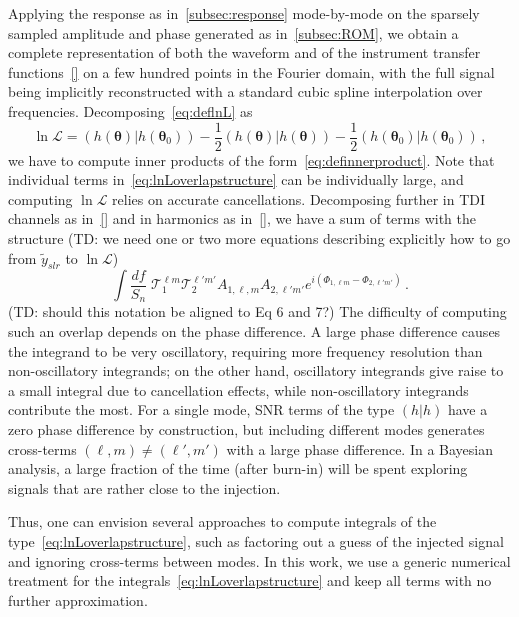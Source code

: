 \documentclass[aps,showpacs,twocolumn,prd,superscriptaddress,nofootinbib]{revtex4-1}
\newcommand{\be}{\begin{equation}}
\newcommand{\ee}{\end{equation}}
\newcommand\calT{{\mathcal{T}}}
\newcommand\calL{{\mathcal{L}}}
\newcommand{\tdc}[1]{{\color{red} (TD: #1)}}
\begin{document}
Applying the response as in~\ref{subsec:response} mode-by-mode on the sparsely sampled amplitude and phase generated as in~\ref{subsec:ROM}, we obtain a complete representation of both the waveform and of the instrument transfer functions~\eqref{} on a few hundred points in the Fourier domain, with the full signal being implicitly reconstructed with a standard cubic spline interpolation over frequencies. Decomposing~\eqref{eq:deflnL} as
\be\label{eq:lnLoverlapstructure}
	\ln \calL = \left( h(\bm{\theta}) | h(\bm{\theta}_{0}) \right)- \frac{1}{2} \left( h(\bm{\theta}) | h(\bm{\theta}) \right) - \frac{1}{2} \left( h(\bm{\theta}_{0}) | h(\bm{\theta}_{0}) \right) \,,
\ee
we have to compute inner products of the form~\eqref{eq:definnerproduct}. Note that individual terms in~\eqref{eq:lnLoverlapstructure} can be individually large, and computing $\ln \calL$ relies on accurate cancellations. Decomposing further in TDI channels as in~\eqref{} and in harmonics as in~\eqref{}, we have a sum of terms with the structure \tdc{we need one or two more equations describing explicitly how to go from $\tilde{y}_{slr}$ to $\ln \calL$}
\be
	\int \frac{df}{S_{n}} \; \calT_{1}^{\ell m} \calT_{2}^{\ell' m'} A_{1,\ell, m} A_{2, \ell' m'} e^{i(\Phi_{1,\ell m} - \Phi_{2,\ell' m'})} \,.
\ee
\tdc{should this notation be aligned to Eq 6 and 7?}
The difficulty of computing such an overlap depends on the phase difference. A large phase difference causes the integrand to be very oscillatory, requiring more frequency resolution than non-oscillatory integrands; on the other hand, oscillatory integrands give raise to a small integral due to cancellation effects, while non-oscillatory integrands contribute the most. For a single mode, SNR terms of the type $(h|h)$ have a zero phase difference by construction, but including different modes generates cross-terms $(\ell, m) \neq (\ell', m')$ with a large phase difference. In a Bayesian analysis, a large fraction of the time (after burn-in) will be spent exploring signals that are rather close to the injection.

Thus, one can envision several approaches to compute integrals of the type~\eqref{eq:lnLoverlapstructure}, such as factoring out a guess of the injected signal~\cite{} and ignoring cross-terms between modes. In this work, we use a generic numerical treatment for the integrals~\eqref{eq:lnLoverlapstructure} and keep all terms with no further approximation.
\end{document}
